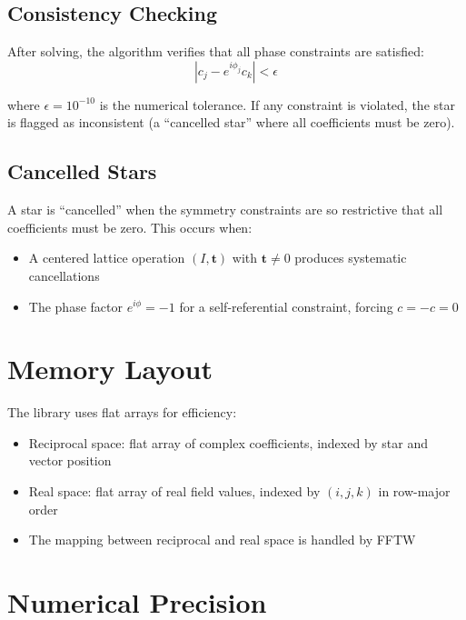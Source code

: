 \subsection{Consistency Checking}

After solving, the algorithm verifies that all phase constraints are satisfied:
\begin{equation}
    |c_j - e^{i\phi_j} c_k| < \epsilon
\end{equation}

where $\epsilon = 10^{-10}$ is the numerical tolerance. If any constraint is violated, the star is flagged as inconsistent (a ``cancelled star'' where all coefficients must be zero).

\subsection{Cancelled Stars}

A star is ``cancelled'' when the symmetry constraints are so restrictive that all coefficients must be zero. This occurs when:
\begin{itemize}
    \item A centered lattice operation $(I, \boldsymbol{t})$ with $\boldsymbol{t} \neq 0$ produces systematic cancellations
    \item The phase factor $e^{i\phi} = -1$ for a self-referential constraint, forcing $c = -c = 0$
\end{itemize}

\section{Memory Layout}

The library uses flat arrays for efficiency:

\begin{itemize}
    \item Reciprocal space: flat array of complex coefficients, indexed by star and vector position
    \item Real space: flat array of real field values, indexed by $(i, j, k)$ in row-major order
    \item The mapping between reciprocal and real space is handled by FFTW
\end{itemize}

\section{Numerical Precision}


